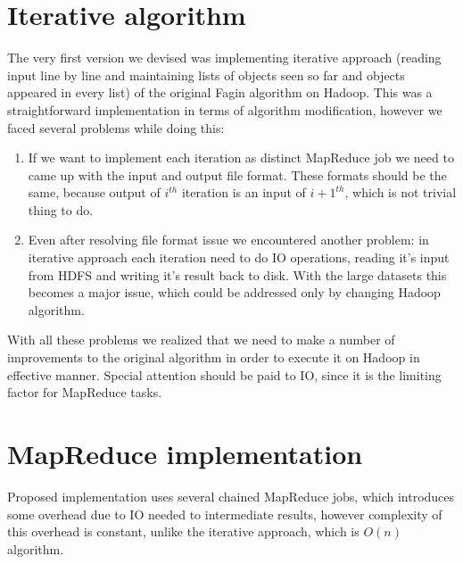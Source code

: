 \documentclass[a4paper]{article}
\begin{document}
\section{Iterative algorithm}
\label{sec:iterative}

The very first version we devised was implementing iterative approach (reading input line by line and maintaining lists of objects seen so far and objects appeared in every list) of the original Fagin algorithm on Hadoop.
This was a straightforward implementation in terms of algorithm modification, however we faced several problems while doing this:
\begin{enumerate}
    \item If we want to implement each iteration as distinct MapReduce job we need to came up with the input and output file format.
    These formats should be the same, because output of $i^{th}$ iteration is an input of $i+1^{th}$, which is not trivial thing to do.
    \item Even after resolving file format issue we encountered another problem: in iterative approach each iteration need to do IO operations, reading it's input from HDFS and writing it's result back to disk.
    With the large datasets this becomes a major issue, which could be addressed only by changing Hadoop algorithm.
\end{enumerate}

With all these problems we realized that we need to make a number of improvements to the original algorithm in order to execute it on Hadoop in effective manner.
Special attention should be paid to IO, since it is the limiting factor for MapReduce tasks. 

\section{MapReduce implementation}
\label{sec:mapreduce}

Proposed implementation uses several chained MapReduce jobs, which introduces some overhead due to IO needed to intermediate results, however complexity of this overhead is constant, unlike the iterative approach, which is $O(n)$ algorithm.
\end{document}
